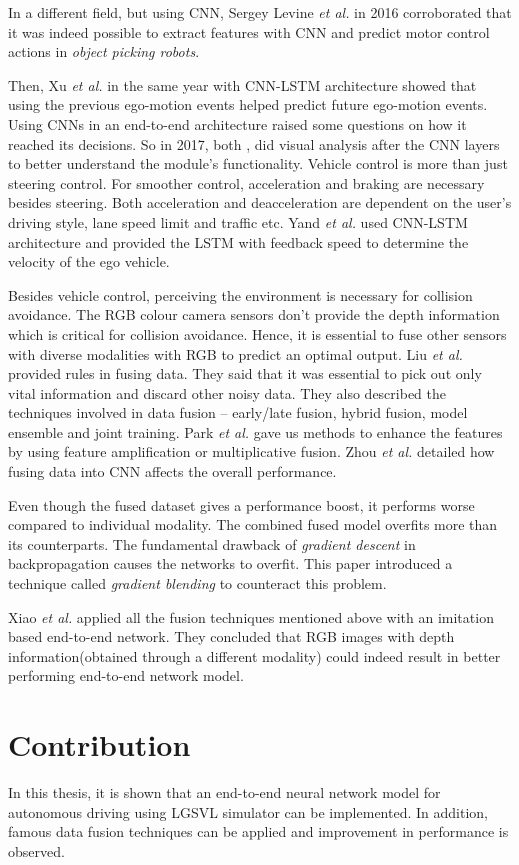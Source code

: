 In a different field, but using CNN, Sergey Levine \textit{et al.}
\cite{GooglePaperonCNNActuation} in 2016 corroborated that it was indeed possible to extract
features with CNN and predict motor control actions in \textit{object picking robots}.

Then, Xu \textit{et al.} \cite{XuGYD16CNNLSTM} in the same year with CNN-LSTM architecture
showed that using the previous ego-motion events helped predict future ego-motion events.
Using CNNs in an end-to-end architecture raised some questions on how it reached its
decisions. So in 2017, both \cite{heatmapsLearning}, \cite{BojarskiCNN1} did visual
analysis after the CNN layers to better understand the module's functionality.
Vehicle control is more than just steering control. For smoother control, acceleration and
braking are necessary besides steering. Both acceleration and deacceleration are dependent on  the user's driving
style, lane speed limit and traffic etc. Yand \textit{et
al.} \cite{E2EMultimodalDiscreteSpeed} used CNN-LSTM architecture and provided the LSTM
with feedback speed to determine the velocity of the ego vehicle.

Besides vehicle control, perceiving the environment is necessary for collision avoidance.
The RGB colour camera sensors don't provide the depth information which is critical for collision avoidance.
Hence, it is essential to fuse other sensors with diverse modalities with RGB to predict an optimal output.
Liu \textit{et al.} \cite{liu2018learn} provided rules in fusing data. They said that it was
essential to pick out only vital information and discard other noisy data.
They also described the techniques involved in data fusion -- early/late
fusion, hybrid fusion, model ensemble and joint training. Park \textit{et
al.} \cite{ParkHBB16} gave us methods to enhance the features by using feature amplification
or multiplicative fusion. Zhou \textit{et al.} \cite{ZhouSideChannel} detailed how fusing
data into CNN affects the overall performance.

Even though the fused dataset gives a performance boost, it performs worse
compared to individual modality. The combined fused model overfits more
than its counterparts. The fundamental drawback of
\textit{gradient descent} in backpropagation causes the networks to overfit. This paper \cite{wang2020makes} introduced a technique
called \textit{gradient blending} to counteract this problem.

Xiao \textit{et al.}\cite{XiaoCodevillaMultimodalE2E} applied all the fusion techniques
mentioned above with an imitation based end-to-end network\cite{codevilla2017endtoend}.
They concluded that RGB images with depth information(obtained through a different modality)
could indeed result in better performing end-to-end network model.

\section{Contribution}
In this thesis, it is shown that an end-to-end neural network model for autonomous driving
using LGSVL simulator can be implemented. In addition, famous data fusion techniques can
be applied and improvement in performance is observed.




